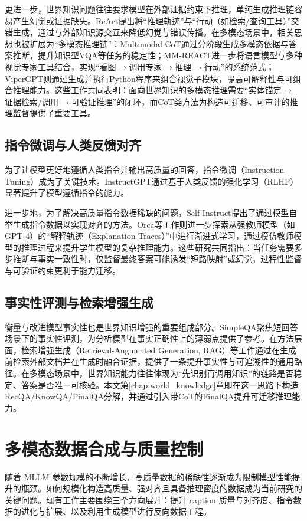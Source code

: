 更进一步，世界知识问题往往要求模型在外部证据约束下推理，单纯生成推理链容易产生幻觉或证据缺失。ReAct提出将“推理轨迹”与“行动（如检索/查询工具）”交错生成，通过与外部知识源交互来降低幻觉与错误传播\citep{yao2023react}。在多模态场景中，相关思想也被扩展为“多模态推理链”：Multimodal-CoT通过分阶段生成多模态依据与答案推断，提升知识型VQA等任务的稳定性\citep{zhang2023multimodalcot}；MM-REACT进一步将语言模型与多种视觉专家工具结合，实现“看图$\rightarrow$调用专家$\rightarrow$推理$\rightarrow$行动”的系统范式\citep{yang2023mmreact}；ViperGPT则通过生成并执行Python程序来组合视觉子模块，提高可解释性与可组合推理能力\citep{suris2023vipergpt}。这些工作共同表明：面向世界知识的多模态推理需要“实体锚定$\rightarrow$证据检索/调用$\rightarrow$可验证推理”的闭环，而CoT类方法为构造可迁移、可审计的推理监督提供了重要工具。

\subsection{指令微调与人类反馈对齐}
为了让模型更好地遵循人类指令并输出高质量的回答，指令微调（Instruction Tuning）成为了关键技术。InstructGPT通过基于人类反馈的强化学习（RLHF）显著提升了模型遵循指令的能力\citep{ouyang2022training}。

进一步地，为了解决高质量指令数据稀缺的问题，Self-Instruct提出了通过模型自举生成指令数据以实现对齐的方法\citep{wang2023selfinstruct}。Orca等工作则进一步探索从强教师模型（如GPT-4）的“解释轨迹（Explanation Traces）”中进行渐进式学习，通过模仿教师模型的推理过程来提升学生模型的复杂推理能力\citep{mukherjee2023orca}。这些研究共同指出：当任务需要多步推断与事实一致性时，仅监督最终答案可能诱发“短路映射”或幻觉，过程性监督与可验证约束更利于能力迁移。

\subsection{事实性评测与检索增强生成}
衡量与改进模型事实性也是世界知识增强的重要组成部分。SimpleQA聚焦短回答场景下的事实性评测，为分析模型在事实正确性上的薄弱点提供了参考\citep{wei2024simpleqa}。在方法层面，检索增强生成（Retrieval-Augmented Generation, RAG）等工作通过在生成前检索外部文档并在生成时融合证据，提供了一条提升事实性与可追溯性的通用路径\citep{lewis2020rag}。在多模态场景中，世界知识能力往往体现为“先识别再调用知识”的链路是否稳定、答案是否唯一可核验。本文第\ref{chap:world_knowledge}章即在这一思路下构造RecQA/\allowbreak KnowQA/\allowbreak FinalQA分解，并通过引入带CoT的FinalQA提升可迁移推理能力。

\section{多模态数据合成与质量控制}
随着 MLLM 参数规模的不断增长，高质量数据的稀缺性逐渐成为限制模型性能提升的瓶颈。如何规模化构造高质量、强对齐且具备推理密度的数据成为当前研究的关键问题。现有工作主要围绕三个方向展开：提升 caption 质量与对齐度、指令数据的进化与扩展、以及利用生成模型进行反向数据工程。

